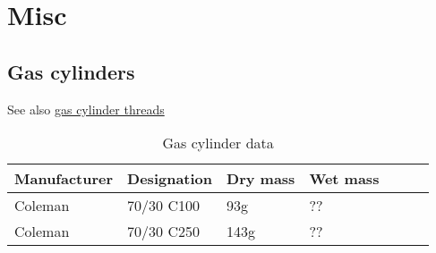 \chapter{Misc}
\section{Gas cylinders} \label{gas_cylinders}


See also \hyperref[gas_cylinder_threads]{gas cylinder threads}


\begin{table}[h!]
    \footnotesize
\begin{longtable}{l|ll|ll|ll}
    Manufacturer
    &Designation
    &Dry mass
    &Wet mass
    \\
\hline
Coleman &70/30 C100 &93g &?? \\
Coleman &70/30 C250 &143g &?? \\
\end{longtable}
\caption{Gas cylinder data}
\end{table}
